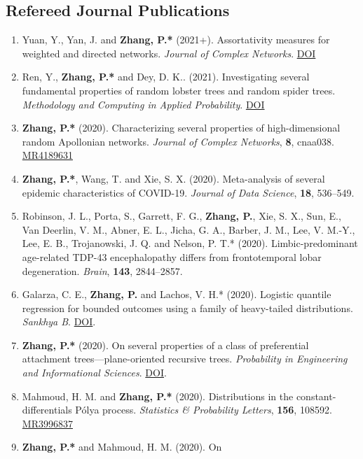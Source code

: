\documentclass[margin]{res}
\def\MR#1{\href{http://www.ams.org/mathscinet-getitem?mr=#1}{MR#1}}
\begin{document}
\begin{resume}
\subsection{Refereed Journal Publications}
\begin{enumerate}
	\item {\sc Yuan, Y., Yan, J.} and {\bf Zhang, P.*} (2021+). 
	Assortativity measures for weighted and directed
	networks. \emph{Journal of Complex Networks}. 
	\href{https://doi.org/10.1093/comnet/cnab017}{DOI}
	\item {\sc Ren, Y.}, {\bf Zhang, P.*} and {\sc Dey, D. K.}. 
	(2021). Investigating several fundamental properties of random 
	lobster trees and random spider trees. {\em Methodology and 
	Computing in Applied Probability}. 
	\href{https://doi.org/10.1007/s11009-021-09863-9}{DOI}
	\item {\bf Zhang, P.*} (2020). Characterizing several 
	properties of high-dimensional random Apollonian networks. {\em 
	Journal of Complex Networks}, {\bf 8}, cnaa038. \MR{4189631}
	\item {\bf Zhang, P.*}, {\sc Wang, T.} and {\sc Xie, S. X.} 
	(2020). Meta-analysis of several epidemic characteristics of 
	COVID-19. {\em Journal of Data Science}, {\bf 18}, 536--549.
	\item {\sc Robinson, J. L., Porta, S., Garrett, F. G.}, {\sc \bf 
	Zhang, P.}, {\sc Xie, S. X., Sun, E., Van Deerlin, V. M., Abner, 
	E. L., Jicha, G. A., Barber, J. M., Lee, V. M.-Y., Lee, E. B., 
	Trojanowski, J. Q.} and {\sc Nelson, P. T.*} (2020). 
	Limbic-predominant age-related TDP-43 encephalopathy differs 
	from frontotemporal lobar degeneration. {\em Brain}, {\bf 143}, 
	2844--2857.
	\item {\sc Galarza, C. E.}, {\bf Zhang, P.} and {\sc Lachos, 
	V. H.*} (2020). Logistic quantile regression for bounded 
	outcomes 
	using a family of heavy-tailed distributions. {\em Sankhya B}. 
	\href{https://doi.org/10.1007/s13571-020-00231-0}{DOI}.
	\item {\bf Zhang, P.*} (2020). On several properties of a 
	class of preferential attachment trees---plane-oriented 
	recursive trees. {\em Probability in Engineering and 
	Informational Sciences}. 
	\href{https://doi.org/10.1017/S0269964820000261}{DOI}.
	\item {\sc Mahmoud, H. M.} and {\bf Zhang, P.*} (2020). 
	Distributions in the constant-differentials P\'{o}lya process. 
	{\em Statistics \& Probability Letters}, \textbf{156}, 108592. 
	\MR{3996837}
	\item {\bf Zhang, P.*} and {\sc Mahmoud, H. M.} (2020). On 

\end{enumerate}
\end{resume}
\end{document}
